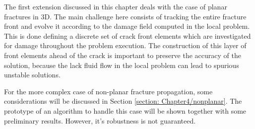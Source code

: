 The first extension discussed in this chapter deals with the case of planar fractures in 3D. The main challenge here consists of tracking the entire fracture front and evolve it according to the damage field computed in the local problem. This is done defining a discrete set of crack front elements which are investigated for damage throughout the problem execution. The construction of this layer of front elements ahead of the crack is important to preserve the accuracy of the solution, because the lack fluid flow in the local problem can lead to spurious unstable solutions.

For the more complex case of non-planar fracture propagation, some considerations will be discussed in Section \ref{section: Chapter4/nonplanar}. The prototype of an algorithm to handle this case will be shown together with some preliminary results. However, it's robustness is not guaranteed. 
